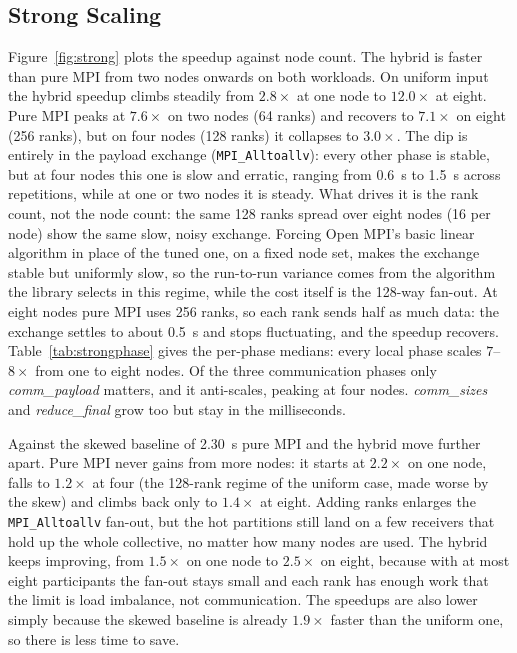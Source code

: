 \documentclass[10pt,twocolumn,a4paper]{article}
\begin{document}
\subsection{Strong Scaling}
Figure~\ref{fig:strong} plots the speedup against node count. The
hybrid is faster than pure MPI from two nodes onwards on both
workloads. On uniform input the hybrid speedup climbs steadily from
$2.8\times$ at one node to $12.0\times$ at eight. Pure MPI
peaks at $7.6\times$ on two nodes (64 ranks) and recovers to
$7.1\times$ on eight (256 ranks), but on four nodes (128 ranks) it
collapses to $3.0\times$. The dip is entirely in the payload exchange
(\texttt{MPI\_Alltoallv}): every other phase is stable, but at four
nodes this one is slow and erratic, ranging from \SI{0.6}{s} to
\SI{1.5}{s} across repetitions, while at one or two nodes it is steady.
What drives it is the rank count, not the node count: the same 128
ranks spread over eight nodes (16 per node) show the same slow, noisy
exchange. Forcing Open MPI's basic linear algorithm in place of the
tuned one, on a fixed node set, makes the exchange stable but uniformly
slow, so the run-to-run variance comes from the algorithm the library
selects in this regime, while the cost itself is the 128-way fan-out. At eight nodes
pure MPI uses 256 ranks, so each rank sends half as much data: the
exchange settles to about \SI{0.5}{s} and stops fluctuating, and the
speedup recovers. Table~\ref{tab:strongphase} gives the per-phase
medians: every local phase scales $7$--$8\times$ from one to eight nodes.
Of the three communication phases only \emph{comm\_payload} matters, and
it anti-scales, peaking at four nodes. \emph{comm\_sizes} and
\emph{reduce\_final} grow too but stay in the milliseconds.

Against the skewed baseline of \SI{2.30}{s} pure MPI and the hybrid
move further apart. Pure MPI never gains from more nodes: it starts
at $2.2\times$ on one node, falls to $1.2\times$ at four (the
128-rank regime of the uniform case, made worse by the skew) and
climbs back only to $1.4\times$ at eight. Adding ranks enlarges the
\texttt{MPI\_Alltoallv} fan-out, but the hot partitions still land
on a few receivers that hold up the whole collective, no matter how
many nodes are used. The hybrid keeps improving, from $1.5\times$ on
one node to $2.5\times$ on eight, because with at most eight
participants the fan-out stays small and each rank has enough work
that the limit is load imbalance, not communication. The speedups
are also lower simply because the skewed baseline is already
$1.9\times$ faster than the uniform one, so there is less time to
save.
\end{document}
